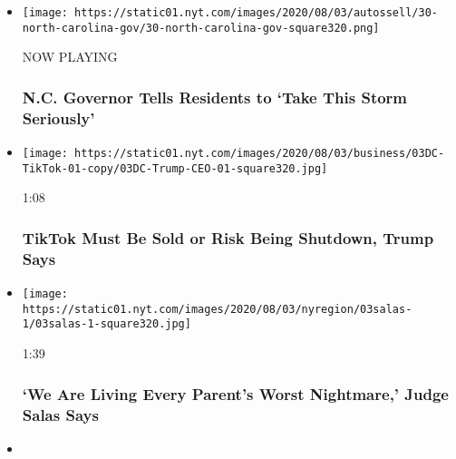 \begin{itemize}
\item
  \texttt{[image: https://static01.nyt.com/images/2020/08/03/autossell/30-north-carolina-gov/30-north-carolina-gov-square320.png]}

  NOW PLAYING

  \hypertarget{nc-governor-tells-residents-to-take-this-storm-seriously-2}{%
  \subsubsection{N.C. Governor Tells Residents to `Take This Storm
  Seriously'}\label{nc-governor-tells-residents-to-take-this-storm-seriously-2}}
\item
  \href{https://www.nytimes.com/video/us/100000007270771/trump-tiktok-shutdown-microsoft.html?action=click\&module=video-series-bar\&region=header\&pgtype=Article\&playlistId=video/latest-video}{}

  \texttt{[image: https://static01.nyt.com/images/2020/08/03/business/03DC-TikTok-01-copy/03DC-Trump-CEO-01-square320.jpg]}

  1:08

  \hypertarget{tiktok-must-be-sold-or-risk-being-shutdown-trump-says}{%
  \subsubsection{TikTok Must Be Sold or Risk Being Shutdown, Trump
  Says}\label{tiktok-must-be-sold-or-risk-being-shutdown-trump-says}}
\item
  \href{https://www.nytimes.com/video/us/100000007269993/judge-salas-new-jersey.html?action=click\&module=video-series-bar\&region=header\&pgtype=Article\&playlistId=video/latest-video}{}

  \texttt{[image: https://static01.nyt.com/images/2020/08/03/nyregion/03salas-1/03salas-1-square320.jpg]}

  1:39

  \hypertarget{we-are-living-every-parents-worst-nightmare-judge-salas-says}{%
  \subsubsection{`We Are Living Every Parent's Worst Nightmare,' Judge
  Salas
  Says}\label{we-are-living-every-parents-worst-nightmare-judge-salas-says}}
\item
  \href{https://www.nytimes.com/video/world/europe/100000007269932/who-coronavirus-briefing.html?action=click\&module=video-series-bar\&region=header\&pgtype=Article\&playlistId=video/latest-video}{}


\end{itemize}
